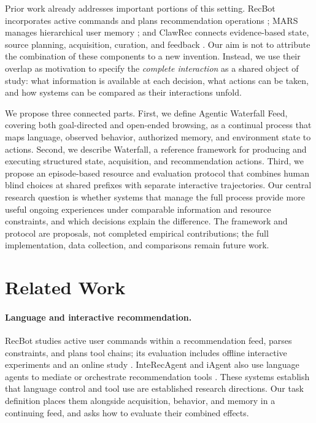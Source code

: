 \documentclass[11pt]{article}
\begin{document}
Prior work already addresses important portions of this setting. RecBot incorporates active commands and plans recommendation operations \citep{tang2026recbot}; MARS manages hierarchical user memory \citep{shen2026mars}; and ClawRec connects evidence-based state, source planning, acquisition, curation, and feedback \citep{wu2026clawrec}. Our aim is not to attribute the combination of these components to a new invention. Instead, we use their overlap as motivation to specify the \emph{complete interaction} as a shared object of study: what information is available at each decision, what actions can be taken, and how systems can be compared as their interactions unfold.

We propose three connected parts. First, we define Agentic Waterfall Feed, covering both goal-directed and open-ended browsing, as a continual process that maps language, observed behavior, authorized memory, and environment state to actions. Second, we describe Waterfall, a reference framework for producing and executing structured state, acquisition, and recommendation actions. Third, we propose an episode-based resource and evaluation protocol that combines human blind choices at shared prefixes with separate interactive trajectories. Our central research question is whether systems that manage the full process provide more useful ongoing experiences under comparable information and resource constraints, and which decisions explain the difference. The framework and protocol are proposals, not completed empirical contributions; the full implementation, data collection, and comparisons remain future work.

\section{Related Work}
\paragraph{Language and interactive recommendation.} RecBot studies active user commands within a recommendation feed, parses constraints, and plans tool chains; its evaluation includes offline interactive experiments and an online study \citep{tang2026recbot}. InteRecAgent and iAgent also use language agents to mediate or orchestrate recommendation tools \citep{huang2025interecagent,xu-etal-2025-iagent}. These systems establish that language control and tool use are established research directions. Our task definition places them alongside acquisition, behavior, and memory in a continuing feed, and asks how to evaluate their combined effects.
\end{document}
